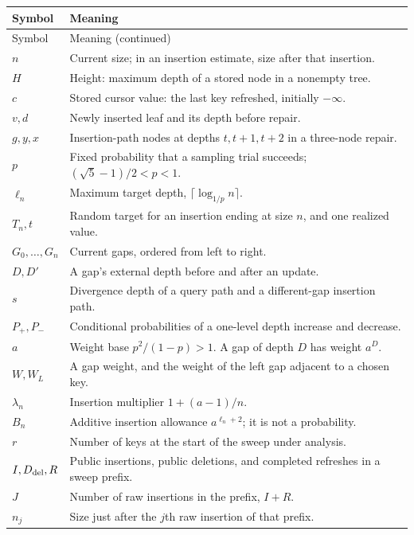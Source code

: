 \documentclass[11pt,a4paper]{article}
\theoremstyle{readable}
\begin{document}
\small
\renewcommand{\arraystretch}{1.15}
\begin{longtable}{@{}p{.22\linewidth}p{.72\linewidth}@{}}
\toprule
Symbol & Meaning \\
\midrule
\endfirsthead
\toprule
Symbol & Meaning (continued) \\
\midrule
\endhead
\bottomrule
\endfoot
$n$ & Current size; in an insertion estimate, size after that insertion. \\
$H$ & Height: maximum depth of a stored node in a nonempty tree. \\
$c$ & Stored cursor value: the last key refreshed, initially $-\infty$. \\
$v,d$ & Newly inserted leaf and its depth before repair. \\
$g,y,x$ & Insertion-path nodes at depths $t,t+1,t+2$ in a three-node repair. \\
$p$ & Fixed probability that a sampling trial succeeds; $(\sqrt5-1)/2<p<1$. \\
$\ell_n$ & Maximum target depth, $\lceil\log_{1/p}n\rceil$. \\
$T_n,t$ & Random target for an insertion ending at size $n$, and one realized value. \\
$G_0,\ldots,G_n$ & Current gaps, ordered from left to right. \\
$D,D'$ & A gap's external depth before and after an update. \\
$s$ & Divergence depth of a query path and a different-gap insertion path. \\
$P_+,P_-$ & Conditional probabilities of a one-level depth increase and decrease. \\
$a$ & Weight base $p^2/(1-p)>1$. A gap of depth $D$ has weight $a^D$. \\
$W,W_L$ & A gap weight, and the weight of the left gap adjacent to a chosen key. \\
$\lambda_n$ & Insertion multiplier $1+(a-1)/n$. \\
$B_n$ & Additive insertion allowance $a^{\ell_n+2}$; it is not a probability. \\
$r$ & Number of keys at the start of the sweep under analysis. \\
$I,D_{\rm del},R$ & Public insertions, public deletions, and completed refreshes in a sweep prefix. \\
$J$ & Number of raw insertions in the prefix, $I+R$. \\
$n_j$ & Size just after the $j$th raw insertion of that prefix. \\

\end{longtable}
\end{document}
